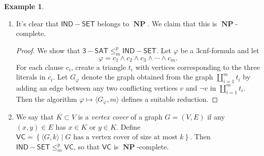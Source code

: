 \documentclass[10pt,letterpaper,cm]{nupset}
\theoremstyle{definition}
\newtheorem{exmp}[definition]{Example}
\theoremstyle{theorem}
\theoremstyle{remark}
\newcommand{\1}{\mathbf{1}}
\newcommand{\0}{\vec 0}
\DeclareMathOperator{\NP}{\mathbf{NP}}
\begin{document}
\begin{exmp}
\begin{enumerate}
\begin{proof}
Let $g_1, \ldots, g_n$ and $x_1, \ldots, x_m$ denote  the Boolean values given by the edges and inputs of $C$, respectively. Relabel $g_1, \ldots, g_n, x_1, \ldots, x_m$ as $w_1, \ldots, w_{n+m}$. Let $\varphi$ be the 3cnf formula in the variables $w_1, \ldots, w_{n+m}$ where each clause of $\varphi$ corresponds either to $C$'s output value $w_s \vee w_s \vee w_s$ or to one of $C$'s internal edges. In the latter case, we can give the following descriptions.
\begin{itemize}
\item  If $w_j = \neg w_i$, then $\varphi$ contains exactly one clause of the form $$  \left(w_i \vee w_j\right) \land \left(\neg w_i \vee \neg w_j\right).
$$
\item If $w_h = w_i \land w_j$ in $C$, then $\varphi$ contains exactly one clause of the form $$  \left(w_i \vee w_j \vee \neg w_h\right) \land \left(w_i \vee \neg w_j \vee \neg w_h\right) \land \left(\neg w_i \vee w_j \vee \neg w_h\right) \land \left(\neg w_i \vee \neg w_j \vee w_h\right).$$
\item If $w_h = w_i \vee w_j$ in $C$, then $\varphi$ contains exactly one clause of the form $$ \left(w_i \vee w_j \vee \neg w_h\right) \land \left(w_i \vee \neg w_j \vee w_h\right) \land \left(\neg w_i \vee w_j \vee w_h\right) \land \left(\neg w_i \vee \neg w_j \vee w_h\right)
.$$
\end{itemize} By construction, $\varphi$ is satisfiable if and only if $C$ is. The algorithm $M: \langle C \rangle \mapsto \varphi$ is linear in $n^k$, hence efficient. Therefore, it is a suitable reduction. 
\end{proof}
\item  It's clear that $\mathsf{IND{-}SET}$ belongs to $\NP$. We claim that this is $\NP$-complete.
\begin{proof}
We show that $\mathsf{3{-}SAT} \leq_m^p \mathsf{IND{-}SET}$.  Let $\varphi$ be a 3cnf-formula and let $$\varphi = c_1 \land c_2 \land c_3 \land \cdots \land c_m.$$ For each clause $c_i$, create a triangle $t_i$ with vertices corresponding to the three literals in $c_i$. Let $G_{\varphi}$ denote the graph obtained from the graph $\coprod_{i=1}^m t_i$ by adding an edge between any two conflicting vertices $v$ and $\neg v$ in $\coprod_{i=1}^m t_i$. Then the algorithm $\varphi \mapsto \langle G_{\varphi}, m\rangle$ defines a suitable reduction. 
\end{proof}
\item We say that $K \subset V$ is a \textit{vertex cover} of a graph $G=\left(V, E\right)$ if any $\left(x,y\right) \in E$ has $x\in K$ or $y\in K$. Define $\mathsf{VC}= \left\{ \langle G, k\rangle \mid G\text{ has a vertex cover of size at most }k\right\}$. Then $\mathsf{IND{-}SET} \leq_m^p \mathsf{VC}$, so that $\mathsf{VC}$ is $\NP$-complete.  

\end{enumerate}
\end{exmp}
\end{document}
